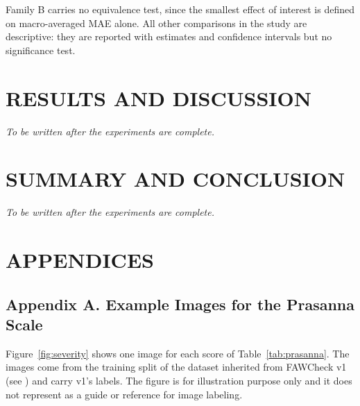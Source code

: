 \documentclass{icsthesis}
\newcommand{\secref}[1]{\textit{\nameref{#1}}}
\begin{document}
\begin{mainmatter}
					Family B carries no equivalence test, since the smallest effect of interest is
					defined on macro-averaged MAE alone.  All other comparisons in the study are descriptive: they are
					reported with estimates and confidence intervals but no significance test.

		\section{RESULTS AND DISCUSSION}\label{sec:results}

			\textit{To be written after the experiments are complete.}

		\section{SUMMARY AND CONCLUSION}\label{sec:conclusion}

			\textit{To be written after the experiments are complete.}


		\section{APPENDICES}\label{sec:appendices}
		\doublespacing

			\subsection{Appendix A. Example Images for the Prasanna Scale}\label{app:severity}

				\setcounter{figure}{0}

				Figure~\ref{fig:severity} shows one image for each score of
				Table~\ref{tab:prasanna}. The images come from the training split of the dataset
				inherited from FAWCheck v1 (see \secref{sec:inherited}) and carry v1's labels.
				The figure is for illustration purpose only and it does not represent as a 
				guide or reference for image labeling.


\end{mainmatter}
\end{document}

